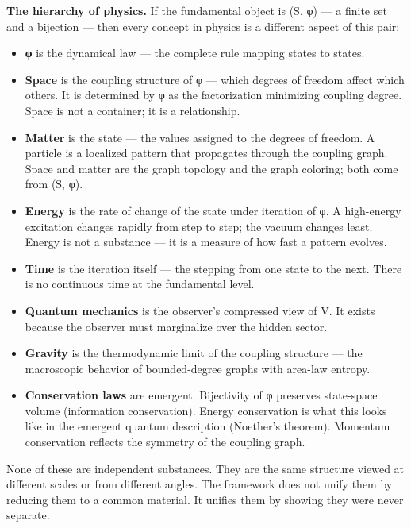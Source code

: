 \documentclass[
]{article}
\providecommand{\tightlist}{%
  \setlength{\itemsep}{0pt}\setlength{\parskip}{0pt}}
\begin{document}
\textbf{The hierarchy of physics.} If the fundamental object is (S, φ)
--- a finite set and a bijection --- then every concept in physics is a
different aspect of this pair:

\begin{itemize}
\tightlist
\item
  \textbf{φ} is the dynamical law --- the complete rule mapping states
  to states.
\item
  \textbf{Space} is the coupling structure of φ --- which degrees of
  freedom affect which others. It is determined by φ as the
  factorization minimizing coupling degree. Space is not a container; it
  is a relationship.
\item
  \textbf{Matter} is the state --- the values assigned to the degrees of
  freedom. A particle is a localized pattern that propagates through the
  coupling graph. Space and matter are the graph topology and the graph
  coloring; both come from (S, φ).
\item
  \textbf{Energy} is the rate of change of the state under iteration of
  φ. A high-energy excitation changes rapidly from step to step; the
  vacuum changes least. Energy is not a substance --- it is a measure of
  how fast a pattern evolves.
\item
  \textbf{Time} is the iteration itself --- the stepping from one state
  to the next. There is no continuous time at the fundamental level.
\item
  \textbf{Quantum mechanics} is the observer's compressed view of V. It
  exists because the observer must marginalize over the hidden sector.
\item
  \textbf{Gravity} is the thermodynamic limit of the coupling structure
  --- the macroscopic behavior of bounded-degree graphs with area-law
  entropy.
\item
  \textbf{Conservation laws} are emergent. Bijectivity of φ preserves
  state-space volume (information conservation). Energy conservation is
  what this looks like in the emergent quantum description (Noether's
  theorem). Momentum conservation reflects the symmetry of the coupling
  graph.
\end{itemize}

None of these are independent substances. They are the same structure
viewed at different scales or from different angles. The framework does
not unify them by reducing them to a common material. It unifies them by
showing they were never separate.
\end{document}

